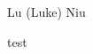 \documentclass[12pt,a4paper]{report}
\newcommand{\myname}{Lu (Luke) Niu}
\begin{document}
\myname

test
\end{document}
